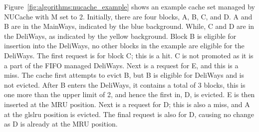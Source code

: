 Figure~\ref{fig:algorithms:nucache_example} shows an example cache set managed by NUCache with M set to 2.
Initially, there are four blocks, A, B, C, and D.
A and B are in the MainWays, indicated by the blue background.
While, C and D are in the DeliWays, as indicated by the yellow background.
Block B is eligible for insertion into the DeliWays, no other blocks in the example are eligible for the DeliWays.
The first request is for block C; this is a hit.
C is not promoted as it is a part of the FIFO managed DeliWays.
Next is a request for E, and this is a miss.
The cache first attempts to evict B, but B is eligible for DeliWays and is not evicted.
After B enters the DeliWays, it contains a total of 3 blocks, this is one more than the upper limit of 2, and hence the first in, D, is evicted.
E is then inserted at the MRU position.
Next is a request for D; this is also a miss, and A at the gls{lru} position is evicted.
The final request is also for D, causing no change as D is already at the MRU position.

